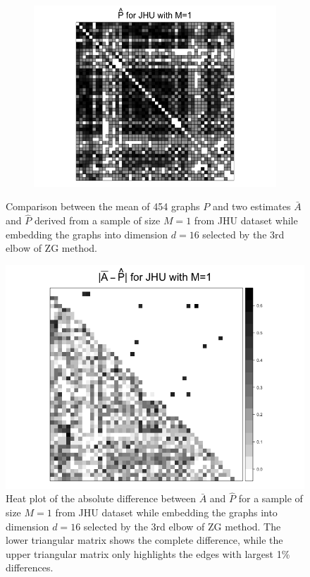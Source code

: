 \documentclass[a4paper]{article}
\begin{document}
\begin{figure}
\begin{subfigure}{.33\textwidth}
  \includegraphics[width=1.2\linewidth]{Phat_JHU_m1.png}
\end{subfigure}
\caption{Comparison between the mean of 454 graphs $P$ and two estimates $\bar{A}$ and $\hat{P}$ derived from a sample of size $M=1$ from JHU dataset while embedding the graphs into dimension $d=16$ selected by the 3rd elbow of ZG method.}
\label{fig:adj_JHU_m1}
\end{figure}

\begin{figure}[!htb]
\centering
\includegraphics[width=1\textwidth]{Diff_JHU_m1.png}
\caption{Heat plot of the absolute difference between $\bar{A}$ and $\hat{P}$ for a sample of size $M=1$ from JHU dataset while embedding the graphs into dimension $d=16$ selected by the 3rd elbow of ZG method. The lower triangular matrix shows the complete difference, while the upper triangular matrix only highlights the edges with largest 1\% differences.}
\label{fig:Diff_JHU_m1}
\end{figure}
\end{document}
